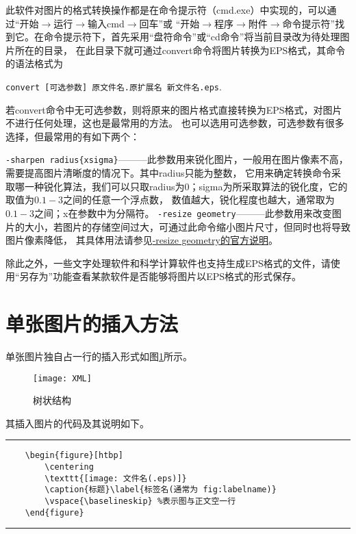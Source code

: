 此软件对图片的格式转换操作都是在命令提示符（cmd.exe）中实现的，可以通过“开始$\to$运行$\to$输入cmd$\to$回车”或
“开始$\to$程序$\to$附件$\to$命令提示符”找到它。在命令提示符下，首先采用“盘符命令”或“cd命令”将当前目录改为待处理图片所在的目录，
在此目录下就可通过convert命令将图片转换为EPS格式，其命令的语法格式为

\indent\verb|convert [可选参数] 原文件名.原扩展名 新文件名.eps|.

若convert命令中无可选参数，则将原来的图片格式直接转换为EPS格式，对图片不进行任何处理，这也是最常用的方法。
也可以选用可选参数，可选参数有很多选择，但最常用的有如下两个：

\verb|-sharpen radius{xsigma}|———此参数用来锐化图片，一般用在图片像素不高，需要提高图片清晰度的情况下。其中radius只能为整数，
它用来确定转换命令采取哪一种锐化算法，我们可以只取radius为0；sigma为所采取算法的锐化度，它的取值为$0.1 - 3$之间的任意一个浮点数，
数值越大，锐化程度也越大，通常取为$0.1 - 3$之间；x在参数中为分隔符。
\verb|-resize geometry|———此参数用来改变图片的大小，若图片的存储空间过大，可通过此命令缩小图片尺寸，但同时也将导致图片像素降低，
其具体用法请参见\href{http://www.imagemagick.org/script/command-line-options.php#resize}{-resize geometry的官方说明}。

除此之外，一些文字处理软件和科学计算软件也支持生成EPS格式的文件，请使用“另存为”功能查看某款软件是否能够将图片以EPS格式的形式保存。

\section{单张图片的插入方法}
单张图片独自占一行的插入形式如图\ref{fig:xml}所示。
\begin{figure}[htbp]
	\centering
	\texttt{[image: XML]}
	\caption{树状结构}\label{fig:xml}
	\vspace{\baselineskip}
\end{figure}


其插入图片的代码及其说明如下。
\vspace{1em}\noindent\hrule
\begin{verbatim}
	\begin{figure}[htbp]
		\centering
		\texttt{[image: 文件名(.eps)]}
		\caption{标题}\label{标签名(通常为 fig:labelname)}
		\vspace{\baselineskip} %表示图与正文空一行
	\end{figure}
\end{verbatim}

\noindent\hrule

